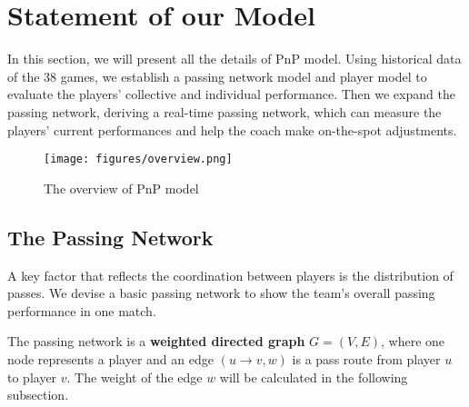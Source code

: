 \documentclass{mcmthesis}
\begin{document}
\section{Statement of our Model} \label{Sec-Model}
In this section, we will present all the details of PnP model. Using historical data of the 38 games, we establish a passing network model and player model to evaluate the players' collective and individual performance. Then we expand the passing network, deriving a real-time passing network, which can measure the players' current performances and help the coach make on-the-spot adjustments.

\begin{figure}[htbp]
  \centering
  \texttt{[image: figures/overview.png]}
  \caption{The overview of PnP model}\label{overview}
\end{figure}

\subsection{The Passing Network}\label{Passing Network}
A key factor that reflects the coordination between players is the distribution of passes. We devise a basic passing network to show the team's overall passing performance in one match.

The passing network is a \textbf{weighted directed graph} $G=(V,E)$, where one node represents a player and an edge $(u\rightarrow v,w)$ is a pass route from player $u$ to player $v$. The weight of the edge $w$ will be calculated in the following subsection.
\end{document}
